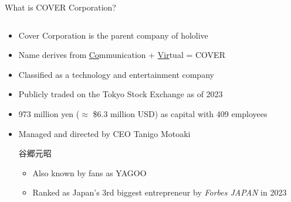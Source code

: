 \documentclass[aspectratio=169]{beamer}
\begin{document}
\begin{frame}{What is COVER Corporation?}
    \begin{columns}
        \begin{column}{0.75\textwidth}
            \begin{itemize}
                \item Cover Corporation is the parent company of hololive
                \item Name derives from \underline{Co}mmunication + \underline{Vir}tual = COVER
                \item Classified as a technology and entertainment company
                \item Publicly traded on the Tokyo Stock Exchange as of 2023
                \item 973 million yen ($\approx$ \$6.3 million USD) as capital with 409 employees
                \item Managed and directed by CEO Tanigo Motoaki \begin{CJK}{UTF8}{min}谷郷元昭\end{CJK}
                \begin{itemize}
                    \item Also known by fans as YAGOO
                    \item Ranked as Japan's 3rd biggest entrepreneur by \textit{Forbes JAPAN} in 2023
                \end{itemize}
            \end{itemize}
        \end{column}
        \begin{column}{0.25\textwidth}

\end{column}
\end{columns}
\end{frame}
\end{document}
